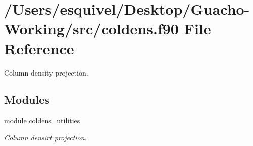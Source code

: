 \hypertarget{coldens_8f90}{}\section{/\+Users/esquivel/\+Desktop/\+Guacho-\/\+Working/src/coldens.f90 File Reference}
\label{coldens_8f90}


Column density projection.  


\subsection*{Modules}
\begin{DoxyCompactItemize}
\item 
module \hyperlink{namespacecoldens__utilities}{coldens\+\_\+utilities}
\begin{DoxyCompactList}\small\item\em Column densirt projection. \end{DoxyCompactList}\end{DoxyCompactItemize}
